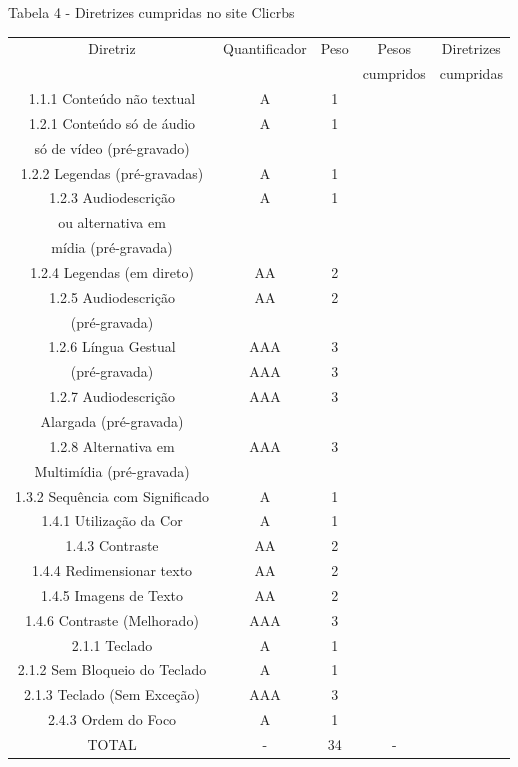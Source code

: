\documentclass[a4paper]{article}
\begin{document}
\begin{titlepage}
Tabela 4 - Diretrizes cumpridas no site Clicrbs\\[-1cm]
\begin{center}
	\fontsize{8pt}{8pt}\selectfont	
	\begin{longtable}{|c|c|c|c|c|}
		\hline
		Diretriz & Quantificador & Peso & Pesos & Diretrizes\\
		& & & cumpridos & cumpridas\\
		\hline
		1.1.1 Conteúdo não textual & A & 1 & & \\
		\hline
		1.2.1 Conteúdo só de áudio & A & 1 & & \\
		só de vídeo (pré-gravado) & & & & \\
		\hline
		1.2.2 Legendas (pré-gravadas) & A & 1 & & \\
		\hline
		1.2.3 Audiodescrição & A & 1 & & \\
		ou alternativa em & & & & \\
		mídia (pré-gravada) & & & & \\
		\hline
		1.2.4 Legendas (em direto) & AA & 2 & & \\
		\hline
		1.2.5 Audiodescrição & AA & 2 & & \\
		(pré-gravada) & & & & \\
		\hline
		1.2.6 Língua Gestual & AAA & 3 & & \\
		(pré-gravada) & AAA & 3 & & \\
		\hline
		1.2.7 Audiodescrição & AAA & 3 & & \\
		Alargada (pré-gravada) & & & & \\
		\hline
		1.2.8 Alternativa em & AAA & 3 & & \\
		Multimídia (pré-gravada) & & & & \\
		\hline
		1.3.2 Sequência com Significado & A & 1 & & \\
		\hline
		1.4.1 Utilização da Cor & A & 1 & & \\
		\hline
		1.4.3 Contraste & AA & 2 & & \\
		\hline
		1.4.4 Redimensionar texto & AA & 2 & & \\
		\hline
		1.4.5 Imagens de Texto & AA & 2 & & \\
		\hline
		1.4.6 Contraste (Melhorado) & AAA & 3 & & \\
		\hline
		2.1.1 Teclado & A & 1 & & \\
		\hline
		2.1.2 Sem Bloqueio do Teclado & A & 1 & & \\
		\hline
		2.1.3 Teclado (Sem Exceção) & AAA & 3 & & \\
		\hline
		2.4.3 Ordem do Foco & A & 1 & & \\
		\hline
		TOTAL & - & 34 & - & \\
		\hline
	\end{longtable}
\end{center}


\end{titlepage}
\end{document}
